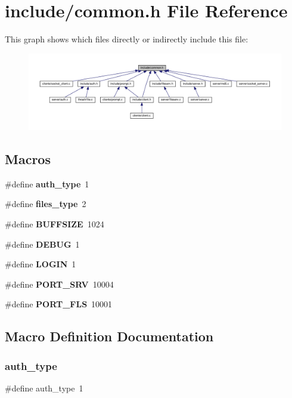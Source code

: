 \section{include/common.h File Reference}
\label{common_8h}
This graph shows which files directly or indirectly include this file\+:\nopagebreak
\begin{figure}[H]
\begin{center}
\leavevmode
\includegraphics[width=350pt]{common_8h__dep__incl}
\end{center}
\end{figure}
\subsection*{Macros}
\begin{DoxyCompactItemize}
\item 
\#define \textbf{ auth\+\_\+type}~1
\item 
\#define \textbf{ files\+\_\+type}~2
\item 
\#define \textbf{ B\+U\+F\+F\+S\+I\+ZE}~1024
\item 
\#define \textbf{ D\+E\+B\+UG}~1
\item 
\#define \textbf{ L\+O\+G\+IN}~1
\item 
\#define \textbf{ P\+O\+R\+T\+\_\+\+S\+RV}~10004
\item 
\#define \textbf{ P\+O\+R\+T\+\_\+\+F\+LS}~10001
\end{DoxyCompactItemize}


\subsection{Macro Definition Documentation}
\mbox{\label{common_8h_aeccf496f78c1193cbacd50d37bf8fa2d}} 
\subsubsection{auth\+\_\+type}
{\footnotesize\ttfamily \#define auth\+\_\+type~1}

